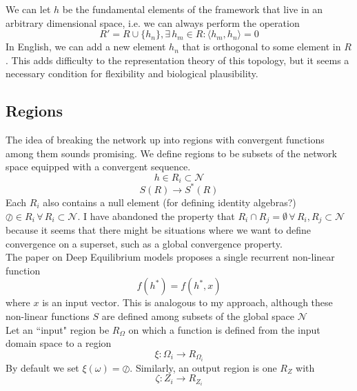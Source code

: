 \documentclass{article}
\begin{document}
We can let $h$ be the fundamental elements of the framework that live in an arbitrary dimensional space, i.e. we can always perform the operation 
\begin{equation}
    R' = R \cup \{h_n \} , \exists  \, h_m \in R : \langle h_m, h_n\rangle = 0
\end{equation}
In English, we can add a new element $h_n$ that is orthogonal to some element in $R$. This adds difficulty to the representation theory of this topology, but it seems a necessary condition for flexibility and biological plausibility.


\subsection{Regions}
The idea of breaking the network up into regions with convergent functions among them sounds promising. We define regions to be subsets of the network space equipped with a convergent sequence. 
\begin{equation}
    h \in R_i \subset \mathcal{N}
\end{equation}
\begin{equation}
    S(R)  \to S^*(R)   
\end{equation}
Each $R_i$ also contains a null element (for defining identity algebras?) $\oslash \in R_i \, \forall \, R_i \subset \mathcal{N}$. I have abandoned the property that $R_i \cap R_j = \emptyset \, \forall \, R_i, R_j \subset \mathcal{N}$ because it seems that there might be situations where we want to define convergence on a superset, such as a global convergence property. \\

The paper on Deep Equilibrium models proposes a single recurrent non-linear function
\begin{equation}
    f(h^*) = f(h^*, x)
\end{equation}
where $x$ is an input vector. This is analogous to my approach, although these non-linear functions $S$ are defined among subsets of the global space $\mathcal{N}$ \\

Let an ``input" region be $R_\Omega$ on which a function is defined from the input domain space to a region
\begin{equation}
    \xi : \Omega_i \to R_{\Omega_i}
\end{equation}
By default we set $\xi(\omega) = \oslash$. Similarly, an output region is one $R_Z$ with
\begin{equation}
    \zeta : Z_i \to R_{Z_i}
\end{equation}
\end{document}
